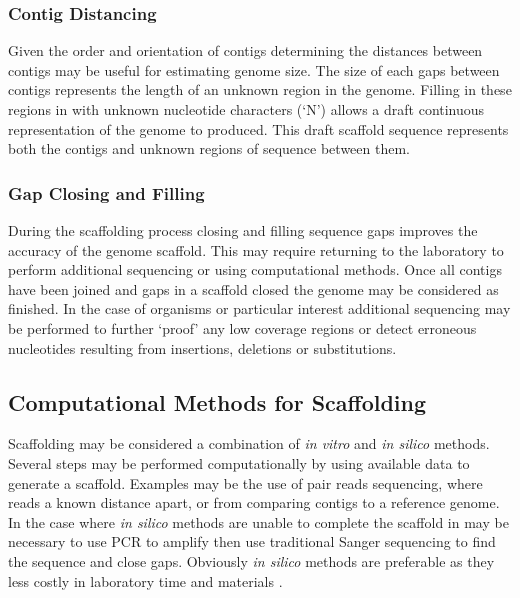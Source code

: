 \documentclass[10pt]{bmc_article}
\newenvironment{bmcformat}{\begin{raggedright}\baselineskip20pt\sloppy\setboolean{publ}{false}}{\end{raggedright}\baselineskip20pt\sloppy}
\begin{document}
\begin{bmcformat}
\subsubsection*{Contig Distancing} %

Given the order and orientation of contigs determining the distances between
contigs may be useful for estimating genome size. The size of each gaps between
contigs represents the length of an unknown region in the genome. Filling in
these regions in with unknown nucleotide characters (`N') allows a draft
continuous representation of the genome to produced. This draft scaffold
sequence represents both the contigs and unknown regions of sequence between
them.

\subsubsection*{Gap Closing and Filling} %

During the scaffolding process closing and filling sequence gaps improves the
accuracy of the genome scaffold. This may require returning to the laboratory
to perform additional sequencing or using computational methods. Once all
contigs have been joined and gaps in a scaffold closed the genome may be
considered as finished. In the case of organisms or particular interest
additional sequencing may be performed to further `proof' any low coverage
regions or detect erroneous nucleotides resulting from insertions, deletions or
substitutions.

\subsection*{Computational Methods for Scaffolding} %

Scaffolding may be considered a combination of \emph{in vitro} and \emph{in
silico} methods. Several steps may be performed computationally by using
available data to generate a scaffold. Examples may be the use of pair reads
sequencing, where reads a known distance apart, or from comparing contigs to
a reference genome. In the case where \emph{in silico} methods are unable to
complete the scaffold in may be necessary to use PCR to amplify then use
traditional Sanger sequencing to find the sequence and close gaps. Obviously
\emph{in silico} methods are preferable as they less costly in laboratory time
and materials \cite{nagarajan2010}. \pb


\end{bmcformat}
\end{document}
